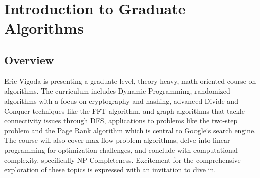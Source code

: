 \section*{Introduction to Graduate Algorithms}

\subsection*{Overview}
Eric Vigoda is presenting a graduate-level, theory-heavy, math-oriented course on algorithms.
The curriculum includes Dynamic Programming, randomized algorithms with a focus on cryptography and hashing, advanced Divide and Conquer techniques like the FFT algorithm, and graph algorithms that tackle connectivity issues through DFS, applications to problems like the two-step problem and the Page Rank algorithm which is central to Google`s search engine.
The course will also cover max flow problem algorithms, delve into linear programming for optimization challenges, and conclude with computational complexity, specifically NP-Completeness.
Excitement for the comprehensive exploration of these topics is expressed with an invitation to dive in.

